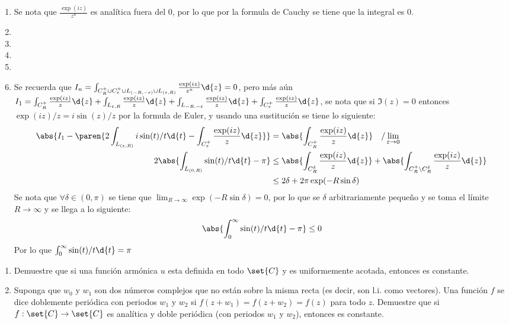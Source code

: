 \documentclass{homework}
\begin{document}
\begin{sol}
    \begin{enumerate}[label=(\alph*)]
        \item Se nota que \(\frac{\exp(iz)}{z^n}\) es analítica fuera del \(0\), por lo que por la formula de Cauchy se tiene que la integral es \(0\).
        \item 
        \item 
        \item 
        \item 
        \item Se recuerda que \(I_n=\int_{C_R^+\cup C_\varepsilon^+\cup L_{(-R,-\varepsilon)}\cup L_{(\varepsilon,R)}}\frac{\exp(iz)}{z^n}\d{z}=0\), pero más aún \(I_1=\int_{C_R^+}\frac{\exp(iz)}z\d{z}+\int_{L_{\varepsilon,R}}\frac{\exp(iz)}z\d{z}+\int_{L_{-R,-\varepsilon}}\frac{\exp(iz)}z\d{z}+\int_{C_\varepsilon^+}\frac{\exp(iz)}z\d{z}\), se nota que si \(\Im(z)=0\) entonces \(\exp(iz)/z=i\sin(z)/z\) por la formula de Euler, y usando una sustitución se tiene lo siguiente:
        \begin{align*}
            \abs{I_1-\paren{2\int_{L_{(\varepsilon,R)}}i\sin(t)/t\d{t}-\int_{C_\varepsilon^+}\frac{\exp(iz)}z\d{z}}}&=\abs{\int_{C_R^+}\frac{\exp(iz)}z\d{z}}\quad/\lim_{\varepsilon\rightarrow 0}\\
            2\abs{\int_{L_{(0,R)}}\sin(t)/t\d{t}-\pi}&\leq\abs{\int_{C_R^\delta}\frac{\exp(iz)}z\d{z}}+\abs{\int_{C_R^+\setminus C_R^\delta}\frac{\exp(iz)}z\d{z}}\\
            &\leq2\delta+2\pi\exp(-R\sin\delta)
        \end{align*}
        Se nota que \(\forall\delta\in(0,\pi)\) se tiene que \(\lim_{R\rightarrow\infty}\exp(-R\sin\delta)=0\), por lo que se \(\delta\) arbitrariamente pequeño y se toma el límite \(R\rightarrow\infty\) y se llega a lo siguiente:
        \begin{equation*}
            \abs{\int_0^\infty\sin(t)/t\d{t}-\pi}\leq 0
        \end{equation*}
        Por lo que \(\int_0^\infty\sin(t)/t\d{t}=\pi\)
    \end{enumerate}
\end{sol}

\begin{prob}
    \begin{enumerate}[label=(\alph*)]
        \item Demuestre que si una función armónica \(u\) esta definida en todo \(\set{C}\) y es uniformemente acotada, entonces es constante.
        \item Suponga que \(w_0\) y \(w_1\) son dos números complejos que no están sobre la misma recta (es decir, son l.i. como vectores). Una función \(f\) se dice doblemente periódica con periodos \(w_1\) y \(w_2\) si \(f(z+w_1)=f(z+w_2)=f(z)\) para todo \(z\). Demuestre que si \(f:\set{C}\rightarrow\set{C}\) es analítica y doble periódica (con periodos \(w_1\) y \(w_2\)), entonces es constante.
    \end{enumerate}
\end{prob}
\end{document}
